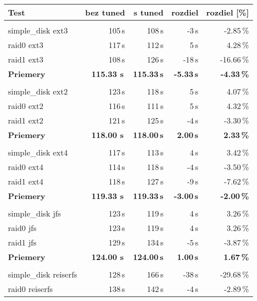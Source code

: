 \begin{table}[H]
\begin{center}
\begin{tabular}{|l|r r r r|}
    \hline
    \textbf{Test} & \textbf{bez tuned} & \textbf{s tuned} & \textbf{rozdiel} & \textbf{rozdiel [\%]} \\
    \hline & \\[-1em]\hline
    simple\_disk ext3 & 105\,s & 108\,s & -3\,s & -2.85\,\% \\
    raid0 ext3 & 117\,s & 112\,s & 5\,s & 4.28\,\% \\
    raid1 ext3 & 108\,s & 126\,s & -18\,s & -16.66\,\% \\
    \hline
    \textbf{Priemery} & \textbf{115.33 s}\,& \textbf{115.33\,s} & \textbf{-5.33\,s} & \textbf{-4.33\,\%} \\
    \hline & \\[-1em]\hline
    simple\_disk ext2 & 123\,s & 118\,s & 5\,s & 4.07\,\% \\
    raid0 ext2 & 116\,s & 111\,s & 5\,s & 4.32\,\% \\
    raid1 ext2 & 121\,s & 125\,s & -4\,s & -3.30\,\% \\
    \hline
    \textbf{Priemery} & \textbf{118.00 s}\,& \textbf{118.00\,s} & \textbf{2.00\,s} & \textbf{2.33\,\%} \\
    \hline & \\[-1em]\hline
    simple\_disk ext4 & 117\,s & 113\,s & 4\,s & 3.42\,\% \\
    raid0 ext4 & 114\,s & 118\,s & -4\,s & -3.50\,\% \\
    raid1 ext4 & 118\,s & 127\,s & -9\,s & -7.62\,\% \\
    \hline
    \textbf{Priemery} & \textbf{119.33 s}\,& \textbf{119.33\,s} & \textbf{-3.00\,s} & \textbf{-2.00\,\%} \\
    \hline & \\[-1em]\hline
    simple\_disk jfs & 123\,s & 119\,s & 4\,s & 3.26\,\% \\
    raid0 jfs & 123\,s & 119\,s & 4\,s & 3.26\,\% \\
    raid1 jfs & 129\,s & 134\,s & -5\,s & -3.87\,\% \\
    \hline
    \textbf{Priemery} & \textbf{124.00 s}\,& \textbf{124.00\,s} & \textbf{1.00\,s} & \textbf{1.67\,\%} \\
    \hline & \\[-1em]\hline
    simple\_disk reiserfs & 128\,s & 166\,s & -38\,s & -29.68\,\% \\
    raid0 reiserfs & 138\,s & 142\,s & -4\,s & -2.89\,\% \\

\end{tabular}
\end{center}
\end{table}

